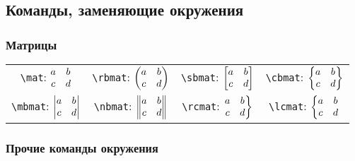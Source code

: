 \documentclass[a4paper]{article}
\newcommand{\rulezz}{\rule[-13pt]{0pt}{31pt}}
\begin{document}
\subsection{Команды, заменяющие окружения}

\subsubsection{Матрицы}

\begin{center}
\begin{tabular}{cccc}
\rulezz\verb"\mat": $\begin{matrix}a&b\\c&d\end{matrix}$ &
\verb"\rbmat": $\begin{pmatrix}a&b\\c&d\end{pmatrix}$ &
\verb"\sbmat": $\begin{bmatrix}a&b\\c&d\end{bmatrix}$ &
\verb"\cbmat": $\begin{Bmatrix}a&b\\c&d\end{Bmatrix}$ \\
\rulezz\verb"\mbmat": $\begin{vmatrix}a&b\\c&d\end{vmatrix}$ &
\verb"\nbmat": $\begin{Vmatrix}a&b\\c&d\end{Vmatrix}$ &
\verb"\rcmat": $\left.\begin{matrix}a&b\\c&d\end{matrix}\right\}$ &
\verb"\lcmat": $\left\{\begin{matrix}a&b\\c&d\end{matrix}\right.$
\end{tabular}
\end{center}

\subsubsection{Прочие команды окружения}
\end{document}
